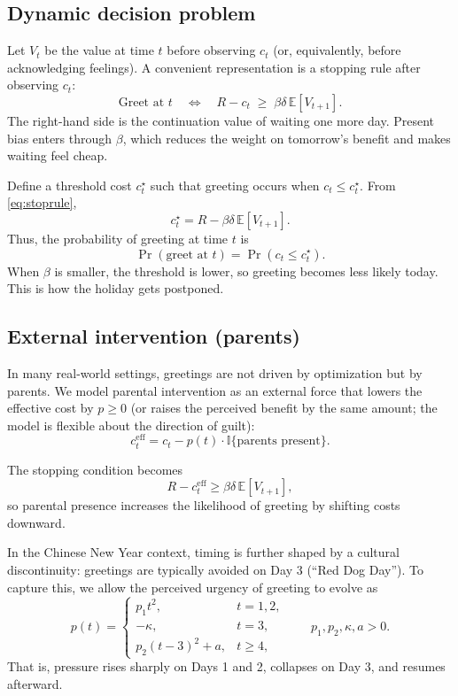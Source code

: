 \documentclass[AER]{AEA}
\newcommand{\E}{\mathbb{E}}
\newcommand{\Ind}{\mathbb{I}}
\begin{document}
\subsection{Dynamic decision problem}
Let $V_t$ be the value at time $t$ before observing $c_t$ (or, equivalently, before acknowledging feelings). A convenient representation is a stopping rule after observing $c_t$:
\begin{equation}
\text{Greet at } t \quad \Longleftrightarrow \quad R - c_t \;\ge\; \beta\delta\, \E[V_{t+1}].
\label{eq:stoprule}
\end{equation}
The right-hand side is the continuation value of waiting one more day. Present bias enters through $\beta$, which reduces the weight on tomorrow's benefit and makes waiting feel cheap.

Define a threshold cost $c_t^\star$ such that greeting occurs when $c_t \le c_t^\star$. From \eqref{eq:stoprule},
\begin{equation}
c_t^\star = R - \beta\delta\, \E[V_{t+1}].
\label{eq:threshold}
\end{equation}
Thus, the probability of greeting at time $t$ is
\begin{equation}
\Pr(\text{greet at } t)=\Pr(c_t \le c_t^\star).
\end{equation}
When $\beta$ is smaller, the threshold is lower, so greeting becomes less likely today. This is how the holiday gets postponed.

\subsection{External intervention (parents)}
In many real-world settings, greetings are not driven by optimization but by parents. We model parental intervention as an external force that lowers the effective cost by $p\ge 0$ (or raises the perceived benefit by the same amount; the model is flexible about the direction of guilt):
\begin{equation}
c_t^{\text{eff}} = c_t - p(t)\cdot \Ind\{\text{parents present}\}.
\label{eq:parents}
\end{equation}

The stopping condition becomes
\begin{equation}
R - c_t^{\text{eff}} \ge \beta\delta\, \E[V_{t+1}],
\end{equation}
so parental presence increases the likelihood of greeting by shifting costs downward.

In the Chinese New Year context, timing is further shaped by a cultural discontinuity: greetings are typically avoided on Day 3 (``Red Dog Day''). To capture this, we allow the perceived urgency of greeting to evolve as
\[
p(t)=
\begin{cases}
p_1 t^2, & t=1,2,\\
-\kappa, & t=3,\\
p_2 (t-3)^2  + a, & t\ge4,
\end{cases}
\qquad p_1,p_2,\kappa, a>0.
\]
That is, pressure rises sharply on Days 1 and 2, collapses on Day 3, and resumes afterward.
\end{document}
